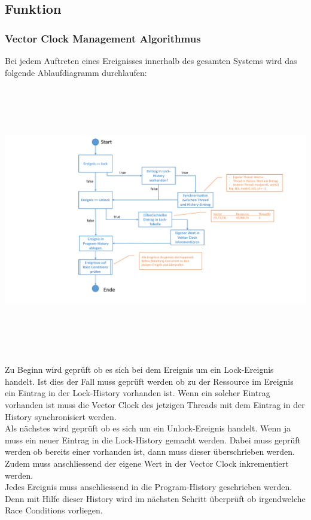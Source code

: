 \documentclass[10pt,a4paper]{article}
\begin{document}
\subsection{Funktion}
\subsubsection{Vector Clock Management Algorithmus}
\begin{flushleft}
Bei jedem Auftreten eines Ereignisses innerhalb des gesamten Systems wird das folgende Ablaufdiagramm durchlaufen:\\[0,5cm]
	\includegraphics[width=16cm,height=12.5cm,trim=70mm 0mm 20mm 0mm, clip]{pictures/Ablaufdiagramm_Algorithmus.pdf}\\

Zu Beginn wird geprüft ob es sich bei dem Ereignis um ein Lock-Ereignis handelt. Ist dies der Fall muss geprüft werden ob zu der Ressource im Ereignis ein Eintrag in der Lock-History vorhanden ist. Wenn ein solcher Eintrag vorhanden ist muss die Vector Clock des jetzigen Threads mit dem Eintrag in der History synchronisiert werden.\\
Als nächstes wird geprüft ob es sich um ein Unlock-Ereignis handelt. Wenn ja muss ein neuer Eintrag in die Lock-History gemacht werden. Dabei muss geprüft werden ob bereits einer vorhanden ist, dann muss dieser überschrieben werden. Zudem muss anschliessend der eigene Wert in der Vector Clock inkrementiert werden.\\
Jedes Ereignis muss anschliessend in die Program-History geschrieben werden. Denn mit Hilfe dieser History wird im nächsten Schritt überprüft ob irgendwelche Race Conditions vorliegen.
\end{flushleft}
\newpage
\end{document}
